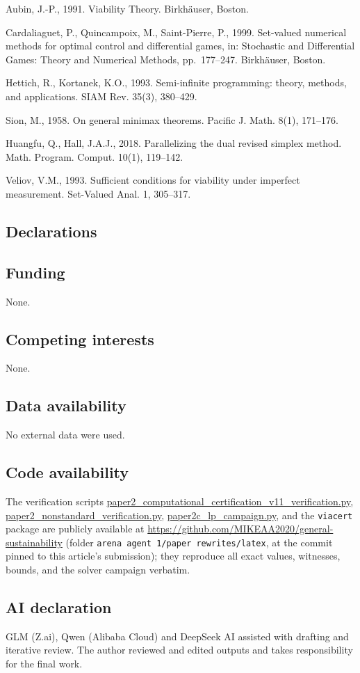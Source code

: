 \documentclass[10pt,twocolumn]{article}
\theoremstyle{plain}
\theoremstyle{definition}
\theoremstyle{remark}
\begin{document}
Aubin, J.-P., 1991. Viability Theory. Birkh\"auser, Boston.

Cardaliaguet, P., Quincampoix, M., Saint-Pierre, P., 1999. Set-valued
numerical methods for optimal control and differential games, in:
Stochastic and Differential Games: Theory and Numerical Methods,
pp.~177--247. Birkh\"auser, Boston.

Hettich, R., Kortanek, K.O., 1993. Semi-infinite programming: theory,
methods, and applications. SIAM Rev. 35(3), 380--429.

Sion, M., 1958. On general minimax theorems. Pacific J. Math. 8(1),
171--176.

Huangfu, Q., Hall, J.A.J., 2018. Parallelizing the dual revised simplex
method. Math. Program. Comput. 10(1), 119--142.

Veliov, V.M., 1993. Sufficient conditions for viability under imperfect
measurement. Set-Valued Anal. 1, 305--317.

\subsection*{Declarations}

\subsection*{Funding}
None.

\subsection*{Competing interests}
None.

\subsection*{Data availability}
No external data were used.

\subsection*{Code availability}
The verification scripts
\url{paper2_computational_certification_v11_verification.py},
\url{paper2_nonstandard_verification.py},
\url{paper2c_lp_campaign.py}, and the \texttt{viacert} package are publicly
available at \url{https://github.com/MIKEAA2020/general-sustainability}
(folder \texttt{arena agent 1/paper rewrites/latex}, at the commit
pinned to this article's submission); they reproduce all exact values,
witnesses, bounds, and the solver campaign verbatim.

\subsection*{AI declaration}
GLM (Z.ai), Qwen (Alibaba Cloud) and DeepSeek AI assisted with drafting
and iterative review. The author reviewed and edited outputs and takes
responsibility for the final work.
\end{document}

